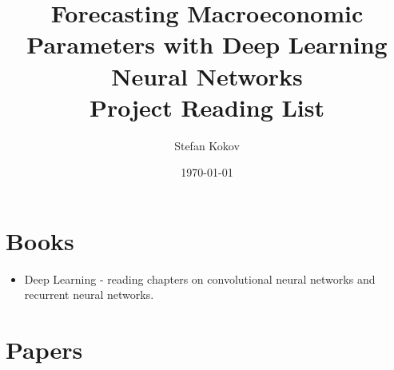 \documentclass[10pt]{article}
\title{Forecasting Macroeconomic Parameters with Deep Learning Neural Networks \\ Project Reading List}
\date{\today}
\author{Stefan Kokov}
\begin{document}
\maketitle

\section{Books}
\begin{itemize}
\item Deep Learning \cite{goodfellow_bengio_courville_2017} - reading chapters on convolutional neural networks and recurrent neural networks.
\end{itemize}


\section{Papers}
\end{document}
